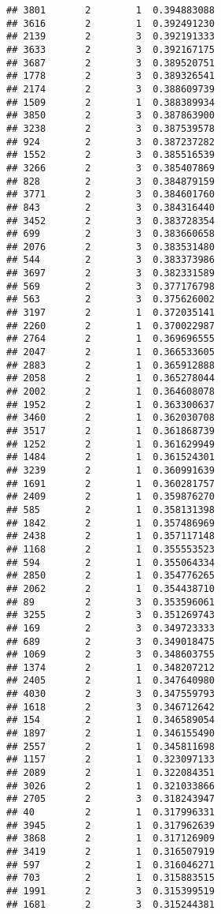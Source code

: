 \documentclass[
]{article}
\begin{document}
\begin{verbatim}
## 3801       2        1  0.394883088
## 3616       2        1  0.392491230
## 2139       2        3  0.392191333
## 3633       2        3  0.392167175
## 3687       2        3  0.389520751
## 1778       2        3  0.389326541
## 2174       2        3  0.388609739
## 1509       2        1  0.388389934
## 3850       2        3  0.387863900
## 3238       2        3  0.387539578
## 924        2        3  0.387237282
## 1552       2        3  0.385516539
## 3266       2        3  0.385407869
## 828        2        3  0.384879159
## 3771       2        3  0.384601760
## 843        2        3  0.384316440
## 3452       2        3  0.383728354
## 699        2        3  0.383660658
## 2076       2        3  0.383531480
## 544        2        3  0.383373986
## 3697       2        3  0.382331589
## 569        2        3  0.377176798
## 563        2        3  0.375626002
## 3197       2        1  0.372035141
## 2260       2        1  0.370022987
## 2764       2        1  0.369696555
## 2047       2        1  0.366533605
## 2883       2        1  0.365912888
## 2058       2        1  0.365278044
## 2002       2        1  0.364608078
## 1952       2        1  0.363300637
## 3460       2        1  0.362030708
## 3517       2        1  0.361868739
## 1252       2        1  0.361629949
## 1484       2        1  0.361524301
## 3239       2        1  0.360991639
## 1691       2        1  0.360281757
## 2409       2        1  0.359876270
## 585        2        1  0.358131398
## 1842       2        1  0.357486969
## 2438       2        1  0.357117148
## 1168       2        1  0.355553523
## 594        2        1  0.355064334
## 2850       2        1  0.354776265
## 2062       2        1  0.354438710
## 89         2        3  0.353596061
## 3255       2        3  0.351269743
## 169        2        3  0.349723333
## 689        2        3  0.349018475
## 1069       2        3  0.348603755
## 1374       2        1  0.348207212
## 2405       2        1  0.347640980
## 4030       2        3  0.347559793
## 1618       2        3  0.346712642
## 154        2        1  0.346589054
## 1897       2        1  0.346155490
## 2557       2        1  0.345811698
## 1157       2        1  0.323097133
## 2089       2        1  0.322084351
## 3026       2        1  0.321033866
## 2705       2        3  0.318243947
## 40         2        1  0.317996331
## 3945       2        1  0.317962639
## 3868       2        1  0.317126909
## 3419       2        1  0.316507919
## 597        2        1  0.316046271
## 703        2        1  0.315883515
## 1991       2        3  0.315399519
## 1681       2        3  0.315244381

\end{verbatim}
\end{document}
